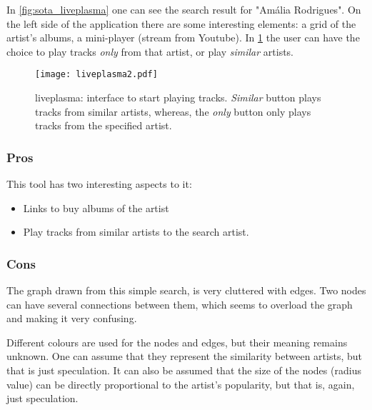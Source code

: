     In \ref{fig:sota_liveplasma} one can see the search result for "Amália Rodrigues".
    On the left side of the application there are some interesting elements: a grid of the artist's albums, a mini-player (stream from Youtube).
    In \ref{fig:sota_liveplasma2} the user can have the choice to play tracks \emph{only} from that artist, or play \emph{similar} artists.

    \begin{figure}[b]
      \begin{center}
        \texttt{[image: liveplasma2.pdf]}
      \end{center}
      \caption{liveplasma: interface to start playing tracks. \emph{Similar} button plays tracks from similar artists, whereas, the \emph{only} button only plays tracks from the specified artist.}
      \label{fig:sota_liveplasma2}
    \end{figure}

    \subsubsection{Pros} %
    \label{ssub:liveplasma_pros}

      This tool has two interesting aspects to it:

      \begin{itemize}
        \item Links to buy albums of the artist
        \item Play tracks from similar artists to the search artist.
      \end{itemize}


    \subsubsection{Cons} %
    \label{ssub:liveplasma_cons}

      The graph drawn from this simple search, is very cluttered with edges.
      Two nodes can have several connections between them, which seems to overload the graph and making it very confusing.

      Different colours are used for the nodes and edges, but their meaning remains unknown. One can assume that they represent the similarity between artists, but that is just speculation.
      It can also be assumed that the size of the nodes (radius value) can be directly proportional to the artist's popularity, but that is, again, just speculation.

